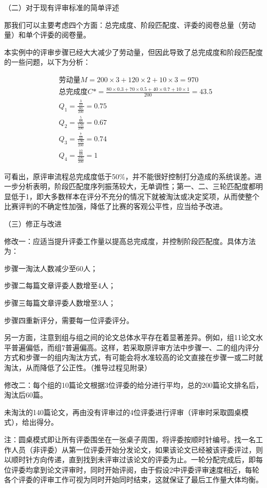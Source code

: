 \documentclass{my_paper}
\begin{document}
	 （二）对于现有评审标准的简单评述
	 
	 那我们可以主要考虑四个方面：总完成度、阶段匹配度、评委的阅卷总量（劳动量）和单个评委的阅卷量。
	 
	 本实例中的评审步骤已经大大减少了劳动量，但因此导致了总完成度和阶段匹配度的一些问题，以下为分析：
	 
	 \begin{align*}
	 	&\mbox{劳动量}M=200 \times 3+120\times2+10\times3=970 \\
	 	&\mbox{总完成度}C*=\displaystyle \frac{80\times 0.3+70\times 0.5+40\times 0.7+10 \times 1}{200}=43.5%
	 	~\\
	 	&Q_1=\frac{\frac{3}{10}}{\frac{80}{200}}=0.75\\
	 	&Q_2=\frac{\frac{5}{10}}{\frac{150}{200}}=0.67\\
	 	&Q_3=\frac{\frac{7}{10}}{\frac{190}{200}}=0.74\\
	 	&Q_4=\frac{\frac{10}{10}}{\frac{200}{200}}=1
	 \end{align*}
 
 	可看出，原评审流程总完成度低于50$\%$，并不能很好控制打分造成的系统误差。进一步分析表明，阶段匹配度序列振荡较大，无单调性；第一、二、三轮匹配度都明显低于1，即大多数样本在评分不充分的情况下就被淘汰或决定奖项，从而使整个比赛评判的不确定性加强，降低了比赛的客观公平性，应当给予改进。
	 	
	 （三）修正与改进
	 
	 修改一：应适当提升评委工作量以提高总完成度，并控制阶段匹配度。具体方法为：
	 
	 步骤一淘汰人数减少至60人；
	 
	 步骤二每篇文章评委人数增至4人；
	 
	 步骤三每篇文章评委人数增至3人；
	 
	 步骤四重新评分，需要每一位评委评分。
	 
	 
	 另一方面，注意到组与组之间的论文总体水平存在着显著差异。例如，组11论文水平普遍偏低，而组7普遍偏高。这样，若采取原评审方法中步骤一、二的组内评分方式和步骤一的组内淘汰方式，有可能会将水准较高的论文直接在步骤一或二时就淘汰，从而降低了公正性。（推导过程见附录）
	 
	 修改二：每个组的10篇论文根据3位评委的给分进行平均，总的200篇论文排名后，淘汰后60篇。
	 
	 未淘汰的140篇论文，再由没有评审过的4位评委进行评审（评审时采取圆桌模式），给出得分。
	 
	 注：圆桌模式即让所有评委围坐在一张桌子周围，将评委按顺时针编号。找一名工作人员（非评委）从第一位评委开始分发论文，如果该论文已经被该评委评过，则以顺时针方向传递，直到找到未评审过该论文的评委为止。一轮分配完成后，即每位评委均拿到论文评审时，同时开始评阅，由于假设2中评委评审速度相近，每轮各个评委的评审工作可视为同时开始同时结束，这就保证了最后工作量大体均衡。
	 
\end{document}
